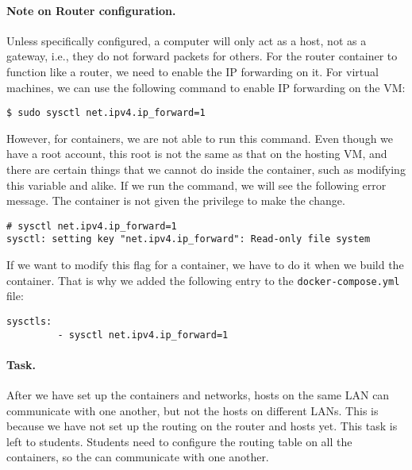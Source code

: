 



\paragraph{Note on Router configuration.}
Unless specifically configured, a computer will only act as a host,
not as a gateway, i.e., they do not forward packets for 
others. For the router container to function like a router,
we need to enable the IP forwarding on it. 
For virtual machines, we can use the following 
command to enable IP forwarding on the VM:

\begin{lstlisting}
$ sudo sysctl net.ipv4.ip_forward=1
\end{lstlisting}

However, for containers, we are not able to run this command. 
Even though we have a root account, this root is not the 
same as that on the hosting VM, and there 
are certain things that we cannot do inside the container, such as 
modifying this variable and alike. If we run the command,
we will see the following error message. The container
is not given the privilege to make the change.

\begin{lstlisting}
# sysctl net.ipv4.ip_forward=1
sysctl: setting key "net.ipv4.ip_forward": Read-only file system
\end{lstlisting}

If we want to modify this flag for a container,
we have to do it when we build the container.
That is why we added the following entry
to the \texttt{docker-compose.yml} file:

\begin{lstlisting}
sysctls:
         - sysctl net.ipv4.ip_forward=1
\end{lstlisting}



\paragraph{Task.} After we have set up the containers and 
networks, hosts on the same LAN can communicate with one another, but
not the hosts on different LANs. This is because we have not set 
up the routing on the router and hosts yet. This task is left 
to students. Students need to configure the routing table 
on all the containers, so the can communicate with one 
another. 


